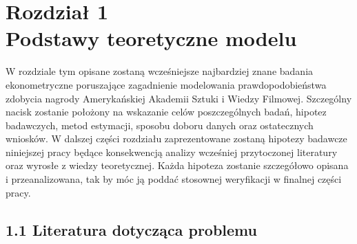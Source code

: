 \newpage
\chapter*{Rozdział 1 \\ \vspace{1cm} Podstawy teoretyczne modelu}

W rozdziale tym opisane zostaną wcześniejsze najbardziej znane badania ekonometryczne poruszające zagadnienie modelowania prawdopodobieństwa zdobycia nagrody Amerykańskiej Akademii Sztuki i Wiedzy Filmowej. Szczególny nacisk zostanie położony na wskazanie celów poszczególnych badań, hipotez badawczych, metod estymacji, sposobu doboru danych oraz ostatecznych wniosków. W dalszej części rozdziału zaprezentowane zostaną hipotezy badawcze niniejszej pracy będące konsekwencją analizy wcześniej przytoczonej literatury oraz wyrosłe z wiedzy teoretycznej. Każda hipoteza zostanie szczegółowo opisana i przeanalizowana, tak by móc ją poddać stosownej weryfikacji w finalnej części pracy. 
 
\section*{1.1 Literatura dotycząca problemu}


